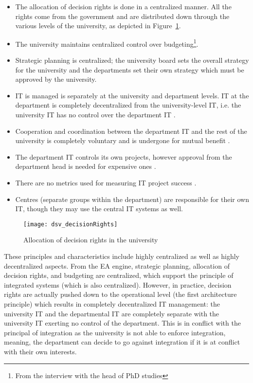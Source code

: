 \begin{itemize}
\item The allocation of decision rights is done in a centralized manner. All the rights come from the government and are distributed down through the various levels of the university, as depicted in Figure~\ref{fig:dsv_decisionRights}.
\item The university maintains centralized control over budgeting\footnote{From the interview with the head of PhD studies\label{fn:interviewPHD}}.
\item Strategic planning is centralized; the university board sets the overall strategy for the university and the departments set their own strategy which must be approved by the university.
\item IT is managed is separately at the university and department levels. IT at the department is completely decentralized from the university-level IT, i.e. the university IT has no control over the department IT .  
\item Cooperation and coordination between the department IT and the rest of the university is completely voluntary and is undergone for mutual benefit . 
\item The department IT controls its own projects, however approval from the department head is needed for expensive ones . 
\item There are no metrics used for measuring IT project success . 
\item Centres (separate groups within the department) are responsible for their own IT, though they may use the central IT systems as well.  %
\end{itemize}

\begin{figure}
\texttt{[image: dsv\_decisionRights]}
\caption{Allocation of decision rights in the university}
\label{fig:dsv_decisionRights}
\end{figure}

These principles and characteristics include highly centralized as well as highly decentralized aspects. From the EA engine, strategic planning, allocation of decision rights, and budgeting are centralized, which support the principle of integrated systems (which is also centralized). However, in practice, decision rights are actually pushed down to the operational level (the first architecture principle) which results in completely decentralized IT management: the university IT and the departmental IT are completely separate with the university IT exerting no control of the department. This is in conflict with the principal of integration as the university is not able to enforce integration, meaning, the department can decide to go against integration if it is at conflict with their own interests. 

